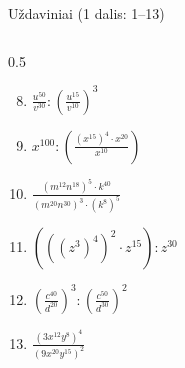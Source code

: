 \documentclass[aspectratio=169,10pt]{beamer}
\begin{document}
\begin{frame}{Uždaviniai (1 dalis: 1--13)}
\begin{columns}[T]
\begin{column}{0.5\textwidth}
\begin{enumerate}
                \setcounter{enumi}{7}

                \item
                $\frac{u^{50}}{v^{30}}
                :
                \left(
                \frac{u^{15}}{v^{10}}
                \right)^3$

                \item
                $x^{100}
                :
                \left(
                \frac{
                (x^{15})^4\cdot x^{20}
                }{
                x^{10}
                }
                \right)$

                \item
                $\frac{
                (m^{12}n^{18})^5\cdot k^{40}
                }{
                (m^{20}n^{30})^3\cdot(k^8)^5
                }$

                \item
                $(((z^3)^4)^2\cdot z^{15}):z^{30}$

                \item
                $\left(
                \frac{c^{40}}{d^{20}}
                \right)^3
                :
                \left(
                \frac{c^{50}}{d^{30}}
                \right)^2$

                \item
                $\frac{
                (3x^{12}y^8)^4
                }{
                (9x^{20}y^{15})^2
                }$

            \end{enumerate}

        \end{column}

    \end{columns}

\end{frame}
\end{document}

